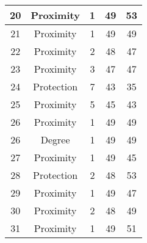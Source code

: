\documentclass[results.tex]{subfiles}
\begin{document}
\begin{center}
\begin{tabular}{| c || c | c | c | c |}
            \hline
            20                      & Proximity                    & 1                      & 49                      & 53                   \\
            \hline
            21                      & Proximity                    & 1                      & 49                      & 49                   \\
            \hline
            22                      & Proximity                    & 2                      & 48                      & 47                   \\
            \hline
            23                      & Proximity                    & 3                      & 47                      & 47                   \\
            \hline
            24                      & Protection                   & 7                      & 43                      & 35                   \\
            \hline
            25                      & Proximity                    & 5                      & 45                      & 43                   \\
            \hline
            26                      & Proximity                    & 1                      & 49                      & 49                   \\
            \hline
            26                      & Degree                       & 1                      & 49                      & 49                   \\
            \hline
            27                      & Proximity                    & 1                      & 49                      & 45                   \\
            \hline
            28                      & Protection                   & 2                      & 48                      & 53                   \\
            \hline
            29                      & Proximity                    & 1                      & 49                      & 47                   \\
            \hline
            30                      & Proximity                    & 2                      & 48                      & 49                   \\
            \hline
            31                      & Proximity                    & 1                      & 49                      & 51                   \\

\end{tabular}
\end{center}
\end{document}
